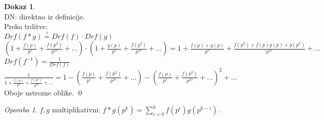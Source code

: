 \documentclass[a4paper, 12pt]{book}
\theoremstyle{definition}
\newtheorem{pro}[counter]{Dokaz}
\theoremstyle{remark}
\newtheorem*{rem}{Opomba}
\begin{document}
\begin{pro} \text{} \\
  DN: direktno iz definicije. \\
  Preko trditve: \\
  $Drf(f * g) \stackrel{?}{=} Drf(f) \cdot Drf(g)$ \\
  $\left(1 + \frac{f(p)}{p^s} + \frac{f(p^2)}{p^{2s}} + \dots \right) \cdot
  \left(1 + \frac{g(p)}{p^s} + \frac{f(g^2)}{p^{2s}} + \dots \right) =
  1 + \frac{f(p) + g(p)}{p^{s}} + \frac{f(p^2) + f(p) g(p) + g(p^2)}{p^{2s}} + \dots$ \\
  $Drf(f^{-1}) = \frac{1}{Drf(f)}$ \\
  $\frac{1}{1 + \frac{f(p)}{p^s} + \frac{f(p^2)}{p^{2s}} + \dots} =
  1 - \left(\frac{f(p)}{p^s} + \frac{f(p^2)}{p^{2s}} + \dots\right) -
  \left(\frac{f(p)}{p^s} + \frac{f(p^2)}{p^{2s}} + \dots\right)^2 + \dots$ \\
  Oboje ustrezne oblike.
  \qed
\end{pro}
\begin{rem}
  $f, g$ multiplikativni: $f * g\left(p^k\right) = \sum_{i=0}^{k} f\left(p^i\right) g\left(p^{k-i}\right)$.
\end{rem}
\end{document}
